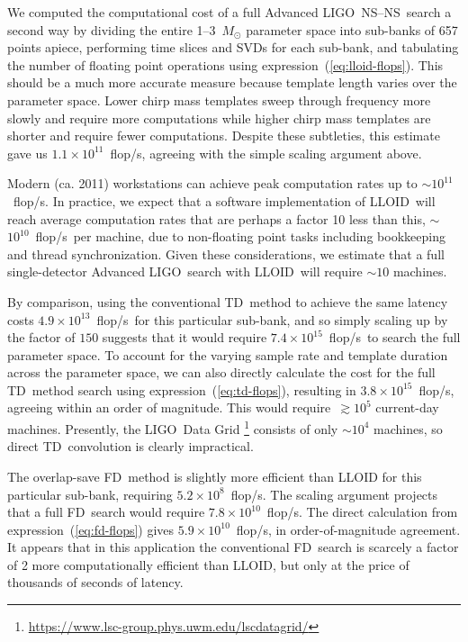 \documentclass[preprint2]{aastex}
\newcommand{\NS}{NS}
\newcommand{\LIGO}{LIGO}%
\newcommand{\flops}{flop/s}
\newcommand{\lloid}{LLOID}%
\newcommand{\TD}{TD}%
\newcommand{\FD}{FD}%
\begin{document}
We computed the computational cost of a full Advanced \LIGO\ \NS--\NS\ search a
second way by dividing the entire 1--3~$M_\odot$ parameter space into sub-banks
of 657 points apiece, performing time slices and SVDs for each sub-bank, and
tabulating the number of floating point operations using
expression~(\ref{eq:lloid-flops}).  This should be a much more accurate measure
because template length varies over the parameter space.  Lower chirp mass
templates sweep through frequency more slowly and require more computations
while higher chirp mass templates are shorter and require fewer computations.
Despite these subtleties, this estimate gave us $1.1 \times 10^{11}$~\flops,
agreeing with the simple scaling argument above.

Modern (ca. 2011) workstations can achieve peak
computation rates up to $\sim$$10^{11}$~\flops.  In practice, we expect that a
software implementation of \lloid\ will reach average computation rates that are
perhaps a factor 10 less than this, $\sim$$10^{10}$~\flops\ per machine, due to
non-floating point tasks including bookkeeping and thread synchronization.
Given these considerations, we estimate that a full single-detector Advanced
\LIGO\ search with \lloid\ will require $\sim$$10$ machines.

By comparison, using the conventional \TD\ method to achieve the same latency costs
$4.9 \times 10^{13}$~\flops\ for this particular sub-bank, and so simply scaling up by the factor of $150$ suggests that it would require $7.4 \times 10^{15}$~\flops\
to search the full parameter space.  To account for the varying sample rate and template duration across the parameter space, we can also directly calculate the cost for the full \TD\ method search using expression~(\ref{eq:td-flops}), resulting in $3.8 \times 10^{15}$~\flops, agreeing within an order of magnitude.  This would require~$\gtrsim$$10^5$ current-day machines.  Presently, the \LIGO\ Data Grid%
\footnote{\url{https://www.lsc-group.phys.uwm.edu/lscdatagrid/}} consists of
only $\sim$$10^4$ machines, so direct \TD\ convolution is clearly impractical.

The overlap-save \FD\ method is slightly more efficient than LLOID for this particular sub-bank, requiring $5.2 \times 10^8$~\flops.  The scaling argument projects that a full \FD\ search would require $7.8 \times 10^{10}$~\flops.  The direct calculation from expression~(\ref{eq:fd-flops}) gives $5.9 \times 10^{10}$~\flops, in order-of-magnitude agreement.  It appears that in this application the conventional \FD\ search is scarcely a factor of 2 more computationally efficient than LLOID, but only at the price of thousands of seconds of latency.
\end{document}
